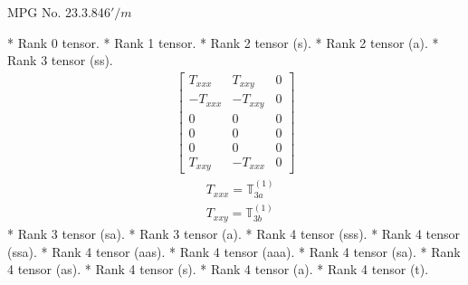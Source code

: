 \documentclass[fleqn,8pt,landscape]{jsarticle}
\begin{document}
\setcounter{MaxMatrixCols}{32}

\renewcommand{\tablename}{Table~}
\renewcommand{\figurename}{Figure~}
\begin{center}
\LARGE
MPG No. 23.3.84\quad$6'/m$
\end{center}
* Rank 0 tensor.
* Rank 1 tensor.
* Rank 2 tensor (s).
* Rank 2 tensor (a).
* Rank 3 tensor (ss).
\begin{align*}
\begin{bmatrix} T_{xxx} & T_{xxy} & 0 \\ - T_{xxx} & - T_{xxy} & 0 \\ 0 & 0 & 0 \\ 0 & 0 & 0 \\ 0 & 0 & 0 \\ T_{xxy} & - T_{xxx} & 0 \end{bmatrix}
\end{align*}
\begin{align*}
& T_{xxx} = \mathbb{T}_{3a}^{(1)} \\
& T_{xxy} = \mathbb{T}_{3b}^{(1)}
\end{align*}
* Rank 3 tensor (sa).
* Rank 3 tensor (a).
* Rank 4 tensor (sss).
* Rank 4 tensor (ssa).
* Rank 4 tensor (aas).
* Rank 4 tensor (aaa).
* Rank 4 tensor (sa).
* Rank 4 tensor (as).
* Rank 4 tensor (s).
* Rank 4 tensor (a).
* Rank 4 tensor (t).
\end{document}

